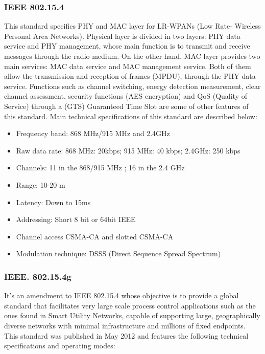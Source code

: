 \documentclass[11pt,final,onecolumn]{IEEEtran}
\begin{document}
\subsubsection{IEEE 802.15.4}

This standard specifies PHY and MAC layer for LR-WPANs (Low Rate- Wireless Personal Area Networks). Physical layer is divided in two layers: PHY data service and PHY management, whose main function is to transmit and receive messages through the radio medium. On the other hand, MAC layer provides two main services: MAC data service and MAC management service. Both of them allow the transmission and reception of frames (MPDU), through the PHY data service. Functions such as channel switching, energy detection measurement, clear channel assessment, security functions (AES encryption) and QoS (Quality of Service) through a (GTS) Guaranteed Time Slot are some of other features of this standard.  Main technical specifications of this standard are described below:

\begin{itemize}
	\item Frequency band: 868 MHz/915 MHz and 2.4GHz
	\item Raw data rate: 868 MHz: 20kbps; 915 MHz: 40 kbps; 2.4GHz: 250 kbps
	\item Channels: 11 in the 868/915 MHz ; 16 in the 2.4 GHz
	\item Range: 10-20 m
	\item Latency: Down to 15ms
	\item Addressing: Short  8 bit or 64bit IEEE
	\item Channel access CSMA-CA and slotted CSMA-CA
	\item Modulation technique: DSSS (Direct Sequence Spread Spectrum)
\end{itemize}

\subsubsection{IEEE. 802.15.4g}

It’s an amendment to IEEE 802.15.4 whose objective is to provide a global standard that facilitates very large scale process control applications such as the ones found in Smart Utility Networks, capable of supporting large, geographically diverse networks with minimal infrastructure and millions of fixed endpoints. This standard was published in May 2012 and features the following technical specifications and operating modes:
\end{document}

